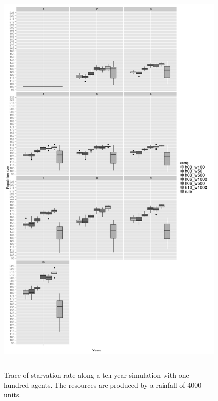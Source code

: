 \documentclass[11pt,oneside,a4paper,openright]{report}
\begin{document}
\begin{figure}[!htb]
\centering
\includegraphics[height=20.2cm]{figures/expm/popClim4000_BW}
\caption{Trace of starvation rate along a ten year simulation with one hundred agents. The resources are produced by a rainfall of 4000 units.}
\label{fig:popClim4000_BW}
\end{figure}
\end{document}
